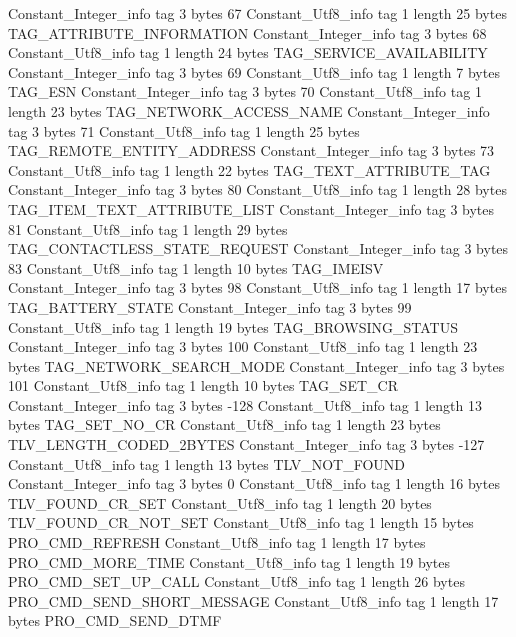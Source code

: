 {{{		}
		Constant_Integer_info {
			tag	3
			bytes	67
		}
		Constant_Utf8_info {
			tag	1
			length	25
			bytes	TAG_ATTRIBUTE_INFORMATION
		}
		Constant_Integer_info {
			tag	3
			bytes	68
		}
		Constant_Utf8_info {
			tag	1
			length	24
			bytes	TAG_SERVICE_AVAILABILITY
		}
		Constant_Integer_info {
			tag	3
			bytes	69
		}
		Constant_Utf8_info {
			tag	1
			length	7
			bytes	TAG_ESN
		}
		Constant_Integer_info {
			tag	3
			bytes	70
		}
		Constant_Utf8_info {
			tag	1
			length	23
			bytes	TAG_NETWORK_ACCESS_NAME
		}
		Constant_Integer_info {
			tag	3
			bytes	71
		}
		Constant_Utf8_info {
			tag	1
			length	25
			bytes	TAG_REMOTE_ENTITY_ADDRESS
		}
		Constant_Integer_info {
			tag	3
			bytes	73
		}
		Constant_Utf8_info {
			tag	1
			length	22
			bytes	TAG_TEXT_ATTRIBUTE_TAG
		}
		Constant_Integer_info {
			tag	3
			bytes	80
		}
		Constant_Utf8_info {
			tag	1
			length	28
			bytes	TAG_ITEM_TEXT_ATTRIBUTE_LIST
		}
		Constant_Integer_info {
			tag	3
			bytes	81
		}
		Constant_Utf8_info {
			tag	1
			length	29
			bytes	TAG_CONTACTLESS_STATE_REQUEST
		}
		Constant_Integer_info {
			tag	3
			bytes	83
		}
		Constant_Utf8_info {
			tag	1
			length	10
			bytes	TAG_IMEISV
		}
		Constant_Integer_info {
			tag	3
			bytes	98
		}
		Constant_Utf8_info {
			tag	1
			length	17
			bytes	TAG_BATTERY_STATE
		}
		Constant_Integer_info {
			tag	3
			bytes	99
		}
		Constant_Utf8_info {
			tag	1
			length	19
			bytes	TAG_BROWSING_STATUS
		}
		Constant_Integer_info {
			tag	3
			bytes	100
		}
		Constant_Utf8_info {
			tag	1
			length	23
			bytes	TAG_NETWORK_SEARCH_MODE
		}
		Constant_Integer_info {
			tag	3
			bytes	101
		}
		Constant_Utf8_info {
			tag	1
			length	10
			bytes	TAG_SET_CR
		}
		Constant_Integer_info {
			tag	3
			bytes	-128
		}
		Constant_Utf8_info {
			tag	1
			length	13
			bytes	TAG_SET_NO_CR
		}
		Constant_Utf8_info {
			tag	1
			length	23
			bytes	TLV_LENGTH_CODED_2BYTES
		}
		Constant_Integer_info {
			tag	3
			bytes	-127
		}
		Constant_Utf8_info {
			tag	1
			length	13
			bytes	TLV_NOT_FOUND
		}
		Constant_Integer_info {
			tag	3
			bytes	0
		}
		Constant_Utf8_info {
			tag	1
			length	16
			bytes	TLV_FOUND_CR_SET
		}
		Constant_Utf8_info {
			tag	1
			length	20
			bytes	TLV_FOUND_CR_NOT_SET
		}
		Constant_Utf8_info {
			tag	1
			length	15
			bytes	PRO_CMD_REFRESH
		}
		Constant_Utf8_info {
			tag	1
			length	17
			bytes	PRO_CMD_MORE_TIME
		}
		Constant_Utf8_info {
			tag	1
			length	19
			bytes	PRO_CMD_SET_UP_CALL
		}
		Constant_Utf8_info {
			tag	1
			length	26
			bytes	PRO_CMD_SEND_SHORT_MESSAGE
		}
		Constant_Utf8_info {
			tag	1
			length	17
			bytes	PRO_CMD_SEND_DTMF
}}}
